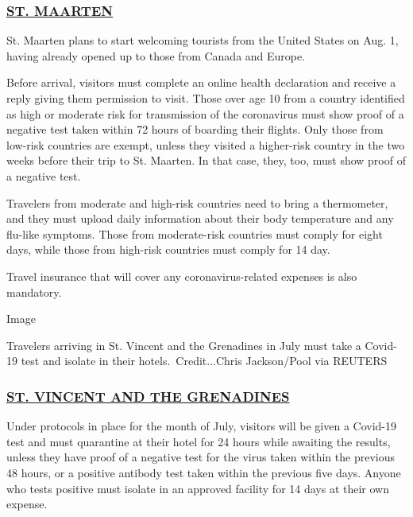 \hypertarget{st-maarten}{%
\subsubsection{\texorpdfstring{\href{https://stmaartenupdates.com}{ST.
MAARTEN}}{ST. MAARTEN}}\label{st-maarten}}

St. Maarten plans to start welcoming tourists from the United States on
Aug. 1, having already opened up to those from Canada and Europe.

Before arrival, visitors must complete an online health declaration and
receive a reply giving them permission to visit. Those over age 10 from
a country identified as high or moderate risk for transmission of the
coronavirus must show proof of a negative test taken within 72 hours of
boarding their flights. Only those from low-risk countries are exempt,
unless they visited a higher-risk country in the two weeks before their
trip to St. Maarten. In that case, they, too, must show proof of a
negative test.

Travelers from moderate and high-risk countries need to bring a
thermometer, and they must upload daily information about their body
temperature and any flu-like symptoms. Those from moderate-risk
countries must comply for eight days, while those from high-risk
countries must comply for 14 day.

Travel insurance that will cover any coronavirus-related expenses is
also mandatory.

Image

Travelers arriving in St. Vincent and the Grenadines in July must take a
Covid-19 test and isolate in their hotels.~Credit...Chris Jackson/Pool
via REUTERS

\hypertarget{st-vincent-and-the-grenadines}{%
\subsubsection{\texorpdfstring{\href{https://www.facebook.com/svgairports/photos/pcb.934154330347186/934153757013910/}{ST.
VINCENT AND THE
GRENADINES}}{ST. VINCENT AND THE GRENADINES}}\label{st-vincent-and-the-grenadines}}

Under protocols in place for the month of July, visitors will be given a
Covid-19 test and must quarantine at their hotel for 24 hours while
awaiting the results, unless they have proof of a negative test for the
virus taken within the previous 48 hours, or a positive antibody test
taken within the previous five days. Anyone who tests positive must
isolate in an approved facility for 14 days at their own expense.


